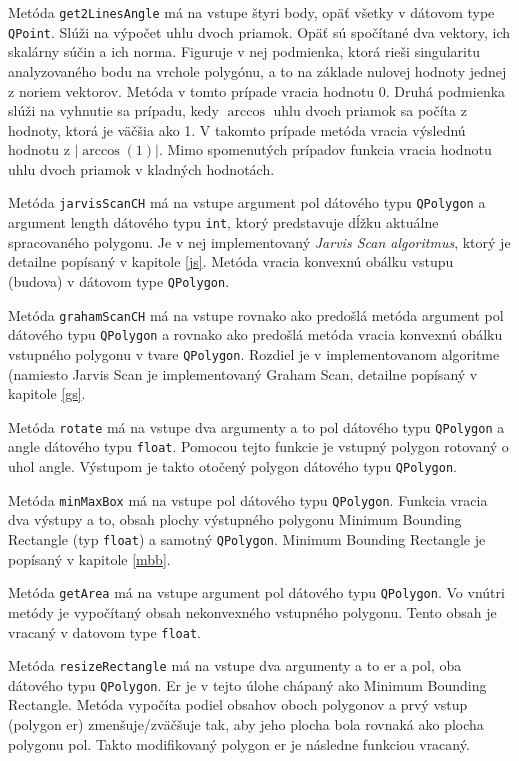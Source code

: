 \documentclass[11pt]{article}
\begin{document}
\begin{enumerate}
Metóda \texttt{get2LinesAngle} má na vstupe štyri body, opäť všetky v dátovom type \texttt{QPoint}. Slúži na výpočet uhlu dvoch priamok. Opäť sú spočítané dva vektory, ich skalárny súčin a ich norma. \newline
Figuruje v nej podmienka, ktorá rieši singularitu analyzovaného bodu na vrchole polygónu, a to na základe nulovej hodnoty jednej z noriem vektorov. Metóda v tomto prípade vracia hodnotu 0.\newline
Druhá podmienka slúži na vyhnutie sa prípadu, kedy $\arccos$ uhlu dvoch priamok sa počíta z hodnoty, ktorá je väčšia ako 1. V takomto prípade metóda vracia výslednú hodnotu z $|\arccos(1)|$.\newline
Mimo spomenutých prípadov funkcia vracia hodnotu uhlu dvoch priamok v kladných hodnotách.

Metóda \texttt{jarvisScanCH} má na vstupe argument pol dátového typu \texttt{QPolygon} a argument length dátového typu \texttt{int}, ktorý predstavuje dĺžku aktuálne spracovaného polygonu. Je v nej implementovaný \textit{Jarvis Scan algoritmus}, ktorý je detailne popísaný v kapitole \ref{js}.
Metóda vracia konvexnú obálku vstupu (budova) v dátovom type \texttt{QPolygon}.

Metóda \texttt{grahamScanCH} má na vstupe rovnako ako predošlá metóda argument pol dátového typu \texttt{QPolygon} a rovnako ako predošlá metóda vracia konvexnú obálku vstupného polygonu v tvare \texttt{QPolygon}. Rozdiel je v implementovanom algoritme (namiesto Jarvis Scan je implementovaný Graham Scan, detailne popísaný v kapitole \ref{gs}.

Metóda \texttt{rotate} má na vstupe dva argumenty a to pol dátového typu \texttt{QPolygon} a angle dátového typu \texttt{float}. Pomocou tejto funkcie je vstupný polygon rotovaný o uhol angle. Výstupom je takto otočený polygon dátového typu \texttt{QPolygon}. 

Metóda \texttt{minMaxBox} má na vstupe pol dátového typu \texttt{QPolygon}. Funkcia vracia dva výstupy a to, obsah plochy výstupného polygonu Minimum Bounding Rectangle (typ \texttt{float}) a samotný \texttt{QPolygon}. Minimum Bounding Rectangle je popísaný v kapitole \ref{mbb}. 

Metóda \texttt{getArea} má na vstupe argument pol dátového typu \texttt{QPolygon}. Vo vnútri metódy je vypočítaný obsah nekonvexného vstupného polygonu. Tento obsah je vracaný v datovom type \texttt{float}.

Metóda \texttt{resizeRectangle} má na vstupe dva argumenty a to er a pol, oba dátového typu \texttt{QPolygon}. Er je v tejto úlohe chápaný ako Minimum Bounding Rectangle. Metóda vypočíta podiel obsahov oboch polygonov a prvý vstup (polygon er) zmenšuje/zväčšuje tak, aby jeho plocha bola rovnaká ako plocha polygonu pol. Takto modifikovaný polygon er je následne funkciou vracaný. 


\end{enumerate}
\end{document}
